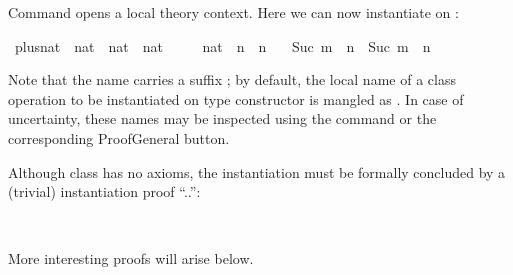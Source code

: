 \begin{isabellebody}
\begin{isamarkuptext}
\noindent Command  opens a local
theory context.  Here we can now instantiate  on
:%
\end{isamarkuptext}%
\isamarkuptrue%
\isamarkupfalse%
\ plus{}nat\ {}{}\ {}nat\ {}\ nat\ {}\ nat{}\ \isanewline
\ \ \ \ {}{}{}{}{}nat{}\ {}\ n\ {}\ n{}\isanewline
\ \ {}\ {}Suc\ m\ {}\ n\ {}\ Suc\ {}m\ {}\ n{}{}%
\begin{isamarkuptext}%
\noindent Note that the name  carries a
suffix ; by default, the local name of a class operation
 to be instantiated on type constructor  is mangled
as .  In case of uncertainty, these names may be inspected
using the \hyperlink{command.print-context}{\mbox{}} command or the corresponding
ProofGeneral button.

Although class  has no axioms, the instantiation must be
formally concluded by a (trivial) instantiation proof ``..'':%
\end{isamarkuptext}%
\isamarkuptrue%
\isamarkupfalse%
%
\isadelimproof
\ %
\endisadelimproof
%
\isatagproof
{}\isamarkupfalse%
%
\endisatagproof
{\isafoldproof}%
%
\isadelimproof
%
\endisadelimproof
%
\begin{isamarkuptext}%
\noindent More interesting  proofs will
arise below.


\end{isamarkuptext}
\end{isabellebody}

